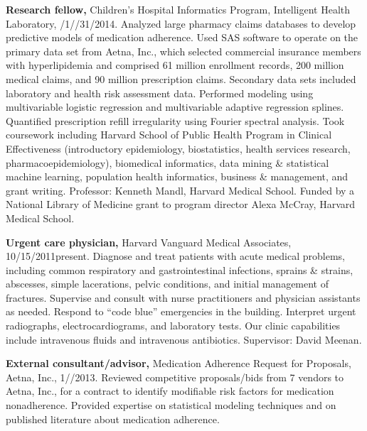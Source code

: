 \documentclass[12pt]{article}
\begin{document}
\textbf{Research fellow,} Children’s Hospital Informatics Program,
Intelligent Health Lab\-o\-ra\-to\-ry,
/1/\ndash{}/31/2014.
Analyzed large pharmacy claims databases to develop predictive models
of medication adherence. Used SAS software to operate on the primary
data set from Aetna, Inc., which selected commercial insurance members
with hyperlipidemia and comprised 61 million enrollment records, 200
million medical claims, and 90 million prescription claims. Secondary
data sets included laboratory and health risk assessment data.
Performed modeling using multivariable logistic regression and
multivariable adaptive regression splines. Quantified prescription
refill irregularity using Fourier spectral analysis. Took coursework
including Harvard School of Public Health Program in Clinical
Effectiveness (introductory epidemiology, biostatistics, health
services research, pharmacoepidemiology), biomedical informatics, data
mining \& statistical machine learning, population health informatics,
business \& management, and grant writing. Professor: Kenneth Mandl,
Harvard Medical School. Funded by a National Library of Medicine grant
to program director Alexa McCray, Harvard Medical School.

\textbf{Urgent care physician,} Harvard Vanguard Medical Associates,
10/15/2011\ndash{}present. Diagnose and treat patients with acute
medical problems, including common respiratory and gastrointestinal
infections, sprains \& strains, abscesses, simple lacerations, pelvic
conditions, and initial management of fractures. Supervise and consult
with nurse practitioners and physician assistants as needed. Respond
to “code blue” emergencies in the building. Interpret urgent
radiographs, electrocardiograms, and laboratory tests. Our clinic
capabilities include intravenous fluids and intravenous antibiotics.
Supervisor: David Meenan.

\textbf{External consultant/advisor,} Medication Adherence Request for
Proposals, Aetna, Inc.,
1/\ndash{}/2013. Reviewed competitive
proposals/bids from 7 vendors to Aetna, Inc., for a contract to
identify modifiable risk factors for medication nonadherence. Provided
expertise on statistical modeling techniques and on published
literature about medication adherence.
\end{document}
